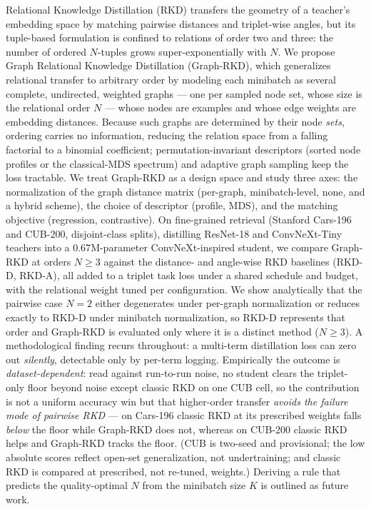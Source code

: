 \documentclass[11pt,letterpaper]{article}
\begin{document}
\noindent
Relational Knowledge Distillation (RKD) transfers the geometry of a teacher's
embedding space by matching pairwise distances and triplet-wise angles, but its
tuple-based formulation is confined to relations of order two and three: the number
of ordered $N$-tuples grows super-exponentially with $N$. We propose Graph
Relational Knowledge Distillation (Graph-RKD), which generalizes relational
transfer to arbitrary order by modeling each minibatch as several complete,
undirected, weighted graphs --- one per sampled node set, whose size is the
relational order $N$ --- whose nodes are examples and whose edge weights are
embedding distances. Because such graphs are determined by their node \emph{sets},
ordering carries no information, reducing the relation space from a falling
factorial to a binomial coefficient; permutation-invariant descriptors (sorted node
profiles or the classical-MDS spectrum) and adaptive graph sampling keep the loss
tractable. We treat Graph-RKD as a design space and study three axes: the
normalization of the graph distance matrix (per-graph, minibatch-level, none, and a
hybrid scheme), the choice of descriptor (profile, MDS), and the matching objective
(regression, contrastive). On fine-grained retrieval (Stanford Cars-196 and
CUB-200, disjoint-class splits), distilling ResNet-18 and ConvNeXt-Tiny teachers
into a $0.67$M-parameter ConvNeXt-inspired student, we compare Graph-RKD at orders
$N \geq 3$ against the distance- and angle-wise RKD baselines (RKD-D, RKD-A), all
added to a triplet task loss under a shared schedule and budget, with the
relational weight tuned per configuration. We show analytically that the pairwise
case $N = 2$ either degenerates under per-graph normalization or reduces exactly to
RKD-D under minibatch normalization, so RKD-D represents that order and Graph-RKD is
evaluated only where it is a distinct method ($N \geq 3$). A methodological finding
recurs throughout: a multi-term distillation loss can zero out \emph{silently},
detectable only by per-term logging. Empirically the outcome is
\emph{dataset-dependent}: read against run-to-run noise, no student clears the
triplet-only floor beyond noise except classic RKD on one CUB cell, so the contribution
is not a uniform accuracy win but that higher-order transfer \emph{avoids the failure
mode of pairwise RKD} --- on Cars-196 classic RKD at its prescribed weights falls
\emph{below} the floor while Graph-RKD does not, whereas on CUB-200 classic RKD helps
and Graph-RKD tracks the floor. (CUB is two-seed and provisional; the low absolute
scores reflect open-set generalization, not undertraining; and classic RKD is compared
at prescribed, not re-tuned, weights.) Deriving a rule that predicts the
quality-optimal $N$ from the minibatch size $K$ is outlined as future work.
\end{document}
